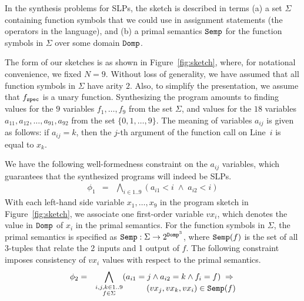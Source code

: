 \documentclass[preprint]{sig-alternate-05-2015}
\def\semp{{\tt{Semp}}}
\def\domp{{\tt{Domp}}}
\def\spec{{\tt{spec}}}
\def\Sig{{\Sigma}}
\begin{document}
In the synthesis problems for SLPs, the sketch is described in terms
(a) a set $\Sig$ containing function symbols that we could use
in assignment statements (the operators in the language), and
(b) a primal semantics $\semp$ for the function symbols in $\Sig$ over some domain $\domp$.





The form of our sketches is as shown in
Figure~\ref{fig:sketch}, where, for notational convenience, we fixed $N=9$.
Without loss of generality, we have assumed that all
function symbols in $\Sig$ have arity $2$.
Also, to simplify the presentation, 
we assume that $f_\spec$ is a unary function.
Synthesizing the program amounts to
finding values for the $9$ variables $f_1,\ldots,f_9$ from
the set $\Sig$, and values for the
$18$ variables $a_{11},a_{12},\ldots,a_{91},a_{92}$ from
the set $\{0,1,\ldots,9\}$. The meaning of variables
$a_{ij}$ is given as follows: if $a_{ij} = k$, then the $j$-th
argument of the function call on Line~$i$ is equal to $x_k$.


We have the following well-formedness constraint on the $a_{ij}$
variables, which guarantees that the synthesized
programs will indeed be SLPs.
\begin{eqnarray*}
  \phi_1 & = & \bigwedge_{i\in 1..9} (a_{i1} < i \;\wedge\; a_{i2}<i)
\end{eqnarray*}
With each left-hand side variable $x_1,\ldots,x_9$ in the program sketch in Figure~\ref{fig:sketch},
we associate one first-order variable
$vx_i$, which denotes the value in $\domp$ of $x_i$ in the primal semantics.
For the function symbols in $\Sig$,
the primal semantics is specified as
$\semp: \Sig \rightarrow 2^{\domp^3}$, where
$\semp(f)$ %
is the set of all $3$-tuples that relate the 2 inputs and 1 output of $f$.
The following constraint imposes consistency of $vx_i$ values with respect to the primal semantics.
\begin{eqnarray*}
  \phi_2 & = & \bigwedge_{\substack{i,j,k\in 1..9\\ f\in\Sig}}
    (a_{i1} = j \wedge a_{i2}=k \wedge f_i=f)\;\Rightarrow\;
      \\*[-2.0em] & & \qquad\qquad\qquad 
     (vx_j,vx_k,vx_i) \in \semp(f) 
\end{eqnarray*}
\end{document}
